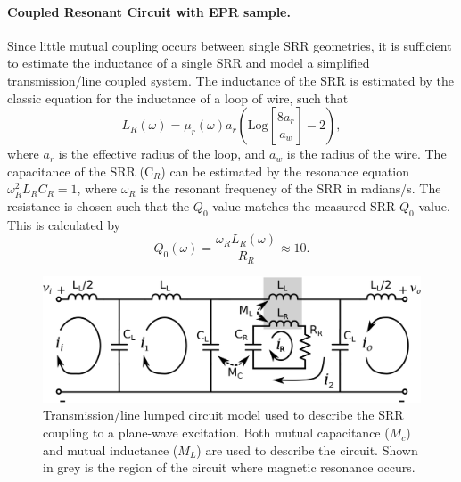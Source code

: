 \noindent \paragraph*{Coupled Resonant Circuit with EPR sample.} Since little mutual coupling occurs between single SRR geometries, it is sufficient to estimate the inductance of a single SRR and model a simplified transmission\-/line coupled system. The inductance of the SRR is estimated by the classic equation for the inductance of a loop of wire, such that 
\begin{equation}
    L_R(\omega) = \mu_r(\omega) a_r \left(\text{Log}\left[ \frac{8 a_r}{a_w} \right] -2\right),
\end{equation}
where $a_r$ is the effective radius of the loop, and $a_w$ is the radius of the wire. \cite{ramo1984fields} The capacitance of the SRR (C$_R$) can be estimated by the resonance equation $\omega_R^2 L_RC_R=1$, where $\omega_R$ is the resonant frequency of the SRR in radians/s. The resistance is chosen such that the $Q_0$-value matches the measured SRR $Q_0$-value. This is calculated by
\begin{equation}
    Q_0(\omega) = \frac{\omega_R L_R(\omega)}{R_R} \approx 10.
\end{equation}

\begin{figure}[htp]
\centering
   \includegraphics[width=\textwidth]{Kapitel/Ch3-Images/03-CircuitFig.eps}%
\caption[Transmission\-/line lumped circuit model.]{Transmission\-/line lumped circuit model used to describe the SRR coupling to a plane-wave excitation. Both mutual capacitance ($M_c$) and mutual inductance ($M_L$) are used to describe the circuit. Shown in grey is the region of the circuit where magnetic resonance occurs.}
  \label{ch3-fig:circuit}
\end{figure}


